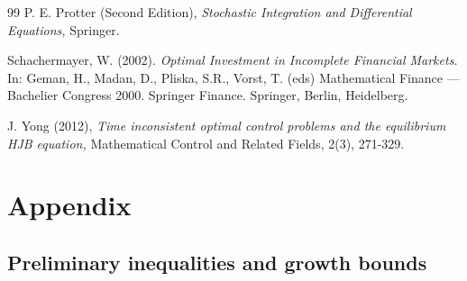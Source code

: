 \documentclass[11pt, psfig]{article}
\theoremstyle{definition}
\theoremstyle{remark}
\numberwithin{equation}{section}
\begin{document}
\begin{thebibliography}{99}
 P. E. Protter (Second Edition),  \textit{Stochastic Integration and Differential Equations,} Springer.

 Schachermayer, W. (2002). \textit{Optimal Investment in Incomplete Financial Markets.} In: Geman, H., Madan, D., Pliska, S.R., Vorst, T. (eds) Mathematical Finance — Bachelier Congress 2000. Springer Finance. Springer, Berlin, Heidelberg. %




 J. Yong (2012), \textit{Time inconsistent optimal control problems and the equilibrium HJB equation,} Mathematical Control and Related Fields, 2(3), 271-329.




\end{thebibliography}

%
%
%
%

\section{Appendix}

\subsection*{Preliminary inequalities and growth bounds}
\end{document}
